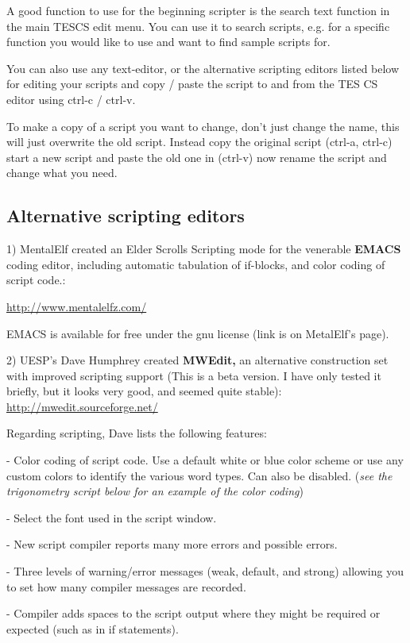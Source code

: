 \documentclass[
]{article}
\begin{document}
A good function to use for the beginning scripter is the search text
function in the main TESCS edit menu. You can use it to search scripts,
e.g. for a specific function you would like to use and want to find
sample scripts for.

You can also use any text-editor, or the alternative scripting editors
listed below for editing your scripts and copy / paste the script to and
from the TES CS editor using ctrl-c / ctrl-v.

To make a copy of a script you want to change, don't just change the
name, this will just overwrite the old script. Instead copy the original
script (ctrl-a, ctrl-c) start a new script and paste the old one in
(ctrl-v) now rename the script and change what you need.

\hypertarget{alternative-scripting-editors}{%
\subsection{Alternative scripting
editors}\label{alternative-scripting-editors}}

1) MentalElf created an Elder Scrolls Scripting mode for the venerable
\textbf{EMACS} coding editor, including automatic tabulation of
if-blocks, and color coding of script code.:

\url{http://www.mentalelfz.com/}

EMACS is available for free under the gnu license (link is on MetalElf's
page).

2) UESP's Dave Humphrey created \textbf{MWEdit,} an alternative
construction set with improved scripting support (This is a beta
version. I have only tested it briefly, but it looks very good, and
seemed quite stable): \url{http://mwedit.sourceforge.net/}

Regarding scripting, Dave lists the following features:

- Color coding of script code. Use a default white or blue color scheme
or use any custom colors to identify the various word types. Can also be
disabled. (\emph{see the trigonometry script below for an example of the
color coding})

- Select the font used in the script window.

- New script compiler reports many more errors and possible errors.

- Three levels of warning/error messages (weak, default, and strong)
allowing you to set how many compiler messages are recorded.

- Compiler adds spaces to the script output where they might be required
or expected (such as in if statements).
\end{document}
